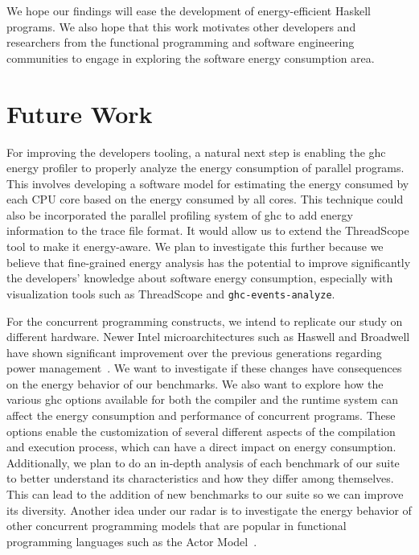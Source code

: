 We hope our findings will ease the development of energy-efficient Haskell programs. We also hope that this work motivates other developers and researchers from the functional programming and software engineering communities to engage in exploring the software energy consumption area.


\section{Future Work}
For improving the developers tooling, a natural next step is enabling the \ac{ghc} energy profiler to properly analyze the energy consumption of parallel programs. This involves developing a software model for estimating the energy consumed by each CPU core based on the energy consumed by all cores. This technique could also be incorporated the parallel profiling system of \ac{ghc} to add energy information to the trace file format. It would allow us to extend the ThreadScope tool to make it energy-aware. We plan to investigate this further because we believe that fine-grained energy analysis has the potential to improve significantly the developers' knowledge about software energy consumption, especially with visualization tools such as ThreadScope and \texttt{ghc-events-analyze}.

For the concurrent programming constructs, we intend to replicate our study on different hardware. Newer Intel microarchitectures such as Haswell and Broadwell have shown significant improvement over the previous generations regarding power management~\cite{huang:2015}. We want to investigate if these changes have consequences on the energy behavior of our benchmarks. We also want to explore how the various \ac{ghc} options available for both the compiler and the runtime system can affect the energy consumption and performance of concurrent programs. These options enable the customization of several different aspects of the compilation and execution process, which can have a direct impact on energy consumption. Additionally, we plan to do an in-depth analysis of each benchmark of our suite to better understand its characteristics and how they differ among themselves. This can lead to the addition of new benchmarks to our suite so we can improve its diversity. Another idea under our radar is to investigate the energy behavior of other concurrent programming models that are popular in functional programming languages such as the Actor Model~\cite{agha:1986}.
